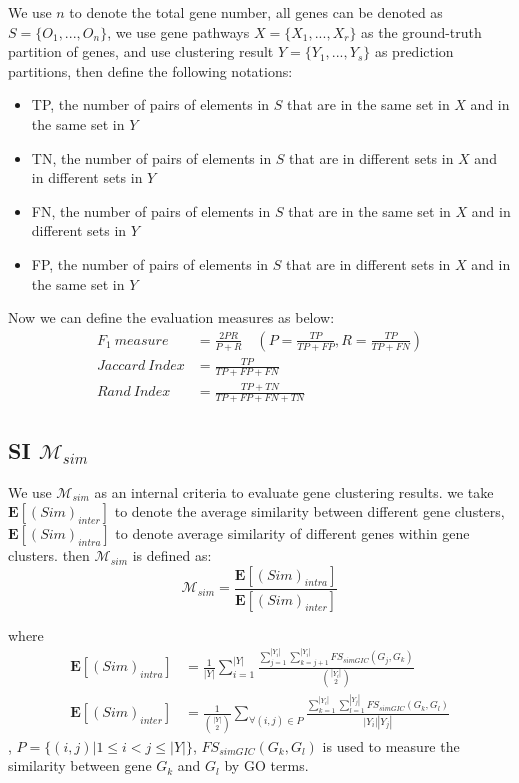 \documentclass{article}
\begin{document}
 We use $n$ to denote the total gene number, all genes can be denoted as $S=\{O_1,...,O_n\}$, we use gene pathways $X=\{X_1,...,X_r\}$ as the ground-truth partition of genes, and use clustering result $Y=\{Y_1,...,Y_s\}$ as prediction partitions, then define the following notations:
 \begin{itemize}
\item TP, the number of pairs of elements in $S$ that are in the same set in $X$ and in the same set in $Y$
\item TN, the number of pairs of elements in $S$ that are in different sets in $X$ and in different sets in $Y$
\item FN, the number of pairs of elements in $S$ that are in the same set in $X$ and in different sets in $Y$
\item FP, the number of pairs of elements in $S$ that are in different sets in $X$ and in the same set in $Y$
\end{itemize}
Now we can define the evaluation measures as below:
\begin{equation}\label{}\nonumber
\begin{split}
F_{1}\ measure&=\frac{2PR}{P+R}\quad(P=\frac{TP}{TP+FP},  R=\frac{TP}{TP+FN}) \\
Jaccard\ Index&=\frac{TP}{TP+FP+FN}\\
Rand\ Index&=\frac{TP+TN}{TP+FP+FN+TN}
\end{split}
\end{equation}

\subsection*{\textbf{SI $\mathcal{M}_{sim}$ }}
We use $\mathcal{M}_{sim}$ \cite{Bordino2010} as an internal criteria to evaluate gene clustering results.
we take $\bm{E}[(Sim)_{inter}]$ to denote the average similarity between different gene clusters, $\bm{E}[(Sim)_{intra}]$ to denote average similarity of different genes within gene clusters. then $\mathcal{M}_{sim}$ is defined as:
\begin{equation}\label{eq:m-sim}
\mathcal{M}_{sim} = \frac{\bm{E}[(Sim)_{intra}]}{\bm{E}[(Sim)_{inter}]}\nonumber
\end{equation}

where
\begin{equation}\label{}\nonumber
\begin{split}
\bm{E}[(Sim)_{intra}]&=\frac{1}{|Y|}\sum_{i=1}^{|Y|}
\frac{\sum_{j=1}^{|Y_i|}\sum_{k=j+1}^{|Y_i|}FS_{simGIC}(G_j,G_k)}{{|Y_i|\choose 2}}\\
\bm{E}[(Sim)_{inter}]&=\frac{1}{{|Y|\choose 2}}\sum_{\forall(i,j)\in P}
\frac{\sum_{k=1}^{|Y_i|}\sum_{l=1}^{|Y_j|}FS_{simGIC}(G_k,G_l)}{|Y_i||Y_j|}
\end{split}
\end{equation}
,
$P=\{(i,j)|1\leq i< j\leq|Y|\}$, $FS_{simGIC}(G_k,G_l)$ \cite{Teng2013} is used to measure the similarity between gene $G_k$ and $G_l$ by GO terms.
\end{document}
